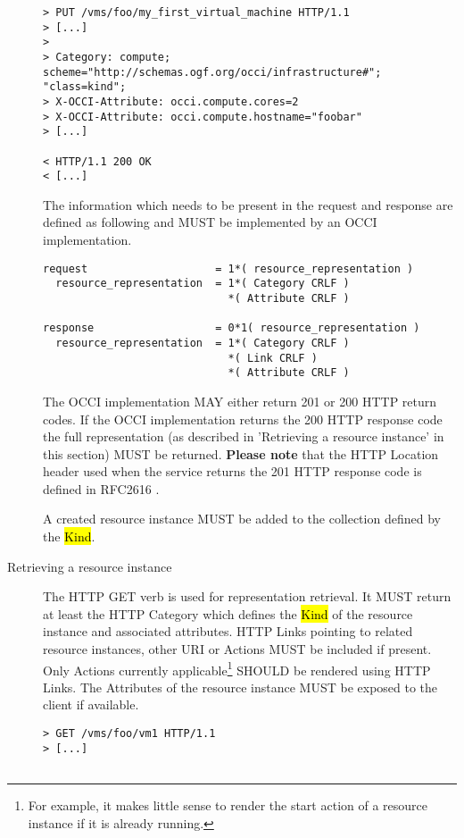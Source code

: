 \documentclass[10pt,a4paper]{article}
\begin{document}
\begin{description}
\begin{verbatim}
> PUT /vms/foo/my_first_virtual_machine HTTP/1.1
> [...]
> 
> Category: compute; scheme="http://schemas.ogf.org/occi/infrastructure#"; "class=kind"; 
> X-OCCI-Attribute: occi.compute.cores=2
> X-OCCI-Attribute: occi.compute.hostname="foobar"
> [...]
 
< HTTP/1.1 200 OK
< [...]
\end{verbatim}

    The information which needs to be present in the request and
    response are defined as following and MUST be implemented by an
    OCCI implementation.

\begin{verbatim}
request                    = 1*( resource_representation )
  resource_representation  = 1*( Category CRLF )
                             *( Attribute CRLF )

response                   = 0*1( resource_representation )
  resource_representation  = 1*( Category CRLF )
                             *( Link CRLF )
                             *( Attribute CRLF )
\end{verbatim}

    The OCCI implementation MAY either return 201 or 200 HTTP return
    codes. If the OCCI implementation returns the 200 HTTP response
    code the full representation (as described in 'Retrieving a
    resource instance' in this section) MUST be
    returned. \textbf{Please note} that the HTTP Location header used
    when the service returns the 201 HTTP response code is defined in
    RFC2616 \cite{rfc2616}.
  
    A created resource instance MUST be added
    to the collection defined by the \hl{Kind}.

  \item[Retrieving a resource instance] The HTTP GET verb is used for
    representation retrieval. It MUST return at least the HTTP
    Category which defines the \hl{Kind} of the resource instance and
    associated attributes. HTTP Links pointing to related resource
    instances, other URI or Actions MUST be included if present. Only
    Actions currently applicable\footnote{For example, it makes little
      sense to render the start action of a resource instance if it is
      already running.} SHOULD be rendered using HTTP Links. The
    Attributes of the resource instance MUST be exposed to the client
    if available.

\begin{verbatim}
> GET /vms/foo/vm1 HTTP/1.1
> [...]
 

\end{verbatim}
\end{description}
\end{document}
